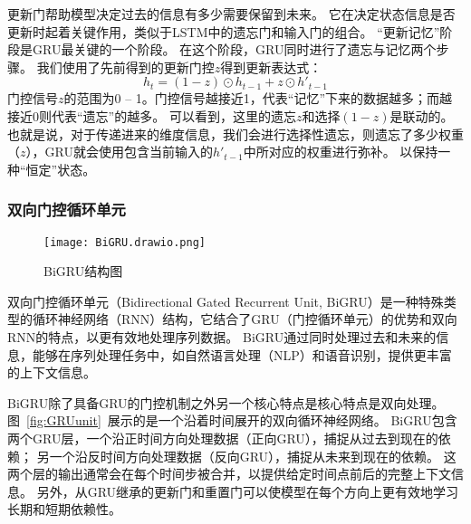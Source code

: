 更新门帮助模型决定过去的信息有多少需要保留到未来。
它在决定状态信息是否更新时起着关键作用，类似于LSTM中的遗忘门和输入门的组合。
“更新记忆”阶段是GRU最关键的一个阶段。
在这个阶段，GRU同时进行了遗忘与记忆两个步骤。
我们使用了先前得到的更新门控$z$得到更新表达式： 
\begin{equation}
  \label{dq:gru_ht}
  h_t = (1-z) \odot h_{t-1} + z \odot h'_{t-1}
\end{equation}
门控信号$z$的范围为0 -- 1。门控信号越接近1，代表“记忆”下来的数据越多；而越接近0则代表“遗忘”的越多。
可以看到，这里的遗忘$z$和选择$(1-z)$是联动的。
也就是说，对于传递进来的维度信息，我们会进行选择性遗忘，则遗忘了多少权重（$z$），GRU就会使用包含当前输入的$h'_{t-1}$中所对应的权重进行弥补。
以保持一种“恒定”状态。

\subsubsection*{双向门控循环单元}

\begin{figure}[htbp]
  \centering
  \texttt{[image: BiGRU.drawio.png]}
  \caption{BiGRU结构图}
  \label{fig:BiGRU}
\end{figure}

双向门控循环单元（Bidirectional Gated Recurrent Unit, BiGRU）是一种特殊类型的循环神经网络（RNN）结构，它结合了GRU（门控循环单元）的优势和双向RNN的特点，以更有效地处理序列数据。
BiGRU通过同时处理过去和未来的信息，能够在序列处理任务中，如自然语言处理（NLP）和语音识别，提供更丰富的上下文信息。


BiGRU除了具备GRU的门控机制之外另一个核心特点是核心特点是双向处理。
图~\ref{fig:GRUunit}~展示的是一个沿着时间展开的双向循环神经网络。
BiGRU包含两个GRU层，一个沿正时间方向处理数据（正向GRU），捕捉从过去到现在的依赖；
另一个沿反时间方向处理数据（反向GRU），捕捉从未来到现在的依赖。
这两个层的输出通常会在每个时间步被合并，以提供给定时间点前后的完整上下文信息。
另外，从GRU继承的更新门和重置门可以使模型在每个方向上更有效地学习长期和短期依赖性。

